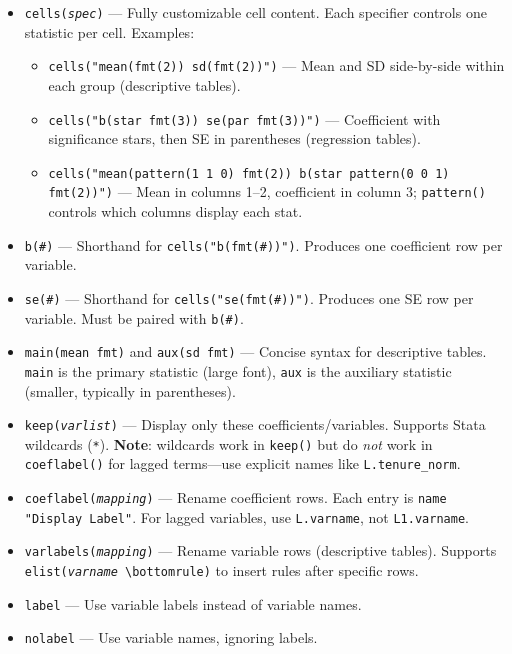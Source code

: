 \documentclass[11pt]{article}
\numberwithin{table}{section}
\begin{document}
\begin{itemize}
    \item \texttt{cells(\emph{spec})} --- Fully customizable cell content. Each specifier controls one statistic per cell. Examples:
    \begin{itemize}
        \item \texttt{cells("mean(fmt(2)) sd(fmt(2))")} --- Mean and SD side-by-side within each group (descriptive tables).
        \item \texttt{cells("b(star fmt(3)) se(par fmt(3))")} --- Coefficient with significance stars, then SE in parentheses (regression tables).
        \item \texttt{cells("mean(pattern(1 1 0) fmt(2)) b(star pattern(0 0 1) fmt(2))")} --- Mean in columns 1--2, coefficient in column 3; \texttt{pattern()} controls which columns display each stat.
    \end{itemize}
    \item \texttt{b(\#)} --- Shorthand for \texttt{cells("b(fmt(\#))")}. Produces one coefficient row per variable.
    \item \texttt{se(\#)} --- Shorthand for \texttt{cells("se(fmt(\#))")}. Produces one SE row per variable. Must be paired with \texttt{b(\#)}.
    \item \texttt{main(mean fmt)} and \texttt{aux(sd fmt)} --- Concise syntax for descriptive tables. \texttt{main} is the primary statistic (large font), \texttt{aux} is the auxiliary statistic (smaller, typically in parentheses).
    \item \texttt{keep(\emph{varlist})} --- Display only these coefficients/variables. Supports Stata wildcards (\texttt{*}). \textbf{Note}: wildcards work in \texttt{keep()} but do \emph{not} work in \texttt{coeflabel()} for lagged terms---use explicit names like \texttt{L.tenure\_norm}.
    \item \texttt{coeflabel(\emph{mapping})} --- Rename coefficient rows. Each entry is \texttt{name "Display Label"}. For lagged variables, use \texttt{L.varname}, not \texttt{L1.varname}.
    \item \texttt{varlabels(\emph{mapping})} --- Rename variable rows (descriptive tables). Supports \texttt{elist(\emph{varname} \textbackslash bottomrule)} to insert rules after specific rows.
    \item \texttt{label} --- Use variable labels instead of variable names.
    \item \texttt{nolabel} --- Use variable names, ignoring labels.
\end{itemize}
\end{document}
